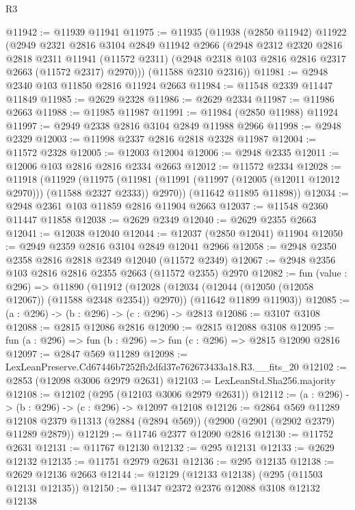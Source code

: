 \begin{lexlean}{R3}
\begin{coremodule}
@11942 := @11939 @11941
@11975 := @11935
    (@11938
      (@2850 @11942)
      @11922
      (@2949
        @2321
        @2816
        @3104
        @2849
        @11942
        @2966
        (@2948
          @2312
          @2320
          @2816
          @2818
          @2311
          @11941
          (@11572 @2311)
          (@2948 @2318 @103 @2816 @2816 @2317 @2663 (@11572 @2317) @2970)))
      (@11588 @2310 @2316))
@11981 := @2948 @2340 @103 @11850 @2816 @11924 @2663
@11984 := @11548 @2339 @11447 @11849
@11985 := @2629 @2328
@11986 := @2629 @2334
@11987 := @11986 @2663
@11988 := @11985 @11987
@11991 := @11984 (@2850 @11988) @11924
@11997 := @2949 @2338 @2816 @3104 @2849 @11988 @2966
@11998 := @2948 @2329
@12003 := @11998 @2337 @2816 @2818 @2328 @11987
@12004 := @11572 @2328
@12005 := @12003 @12004
@12006 := @2948 @2335
@12011 := @12006 @103 @2816 @2816 @2334 @2663
@12012 := @11572 @2334
@12028 := @11918
    (@11929
      (@11975 (@11981 (@11991 (@11997 (@12005 (@12011 @12012 @2970))) (@11588 @2327 @2333)) @2970))
      (@11642 @11895 @11898))
@12034 := @2948 @2361 @103 @11859 @2816 @11904 @2663
@12037 := @11548 @2360 @11447 @11858
@12038 := @2629 @2349
@12040 := @2629 @2355 @2663
@12041 := @12038 @12040
@12044 := @12037 (@2850 @12041) @11904
@12050 := @2949 @2359 @2816 @3104 @2849 @12041 @2966
@12058 := @2948 @2350 @2358 @2816 @2818 @2349 @12040 (@11572 @2349)
@12067 := @2948 @2356 @103 @2816 @2816 @2355 @2663 (@11572 @2355) @2970
@12082 := fun (value : @296) =>
  @11890
    (@11912
      (@12028 (@12034 (@12044 (@12050 (@12058 @12067)) (@11588 @2348 @2354)) @2970))
      (@11642 @11899 @11903))
@12085 := (a : @296) -> (b : @296) -> (c : @296) -> @2813
@12086 := @3107 @3108
@12088 := @2815 @12086 @2816
@12090 := @2815 @12088 @3108
@12095 := fun (a : @296) => fun (b : @296) => fun (c : @296) => @2815 @12090 @2816
@12097 := @2847 @569 @11289
@12098 := LexLeanPreserve.Cd67446b7252fb2dfd37e762673433a18.R3.__fits_20
@12102 := @2853 (@12098 @3006 @2979 @2631)
@12103 := LexLeanStd.Sha256.majority
@12108 := @12102 (@295 (@12103 @3006 @2979 @2631))
@12112 := (a : @296) -> (b : @296) -> (c : @296) -> @12097 @12108
@12126 := @2864
    @569
    @11289
    @12108
    @2379
    @11313
    (@2884 (@2894 @569))
    (@2900 (@2901 (@2902 @2379) @11289 @2879))
@12129 := @11746 @2377 @12090 @2816
@12130 := @11752 @2631
@12131 := @11767 @12130
@12132 := @295 @12131
@12133 := @2629 @12132
@12135 := @11751 @2979 @2631
@12136 := @295 @12135
@12138 := @2629 @12136 @2663
@12144 := @12129 (@12133 @12138) (@295 (@11503 @12131 @12135))
@12150 := @11347 @2372 @2376 @12088 @3108 @12132 @12138

\end{coremodule}
\end{lexlean}
